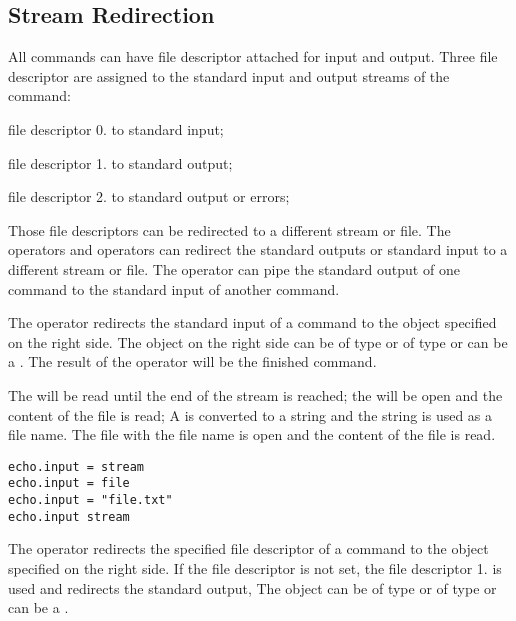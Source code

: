 \subsection{Stream Redirection}

All commands can have file descriptor attached for input and output.
Three file descriptor are assigned to the standard input and output streams
of the command:
\begin{compactitem}
\item file descriptor 0. to standard input;
\item file descriptor 1. to standard output;
\item file descriptor 2. to standard output or errors;
\end{compactitem}

Those file descriptors can be redirected to a different stream
or file. The operators  and
operators \code{<<, >>} can redirect the standard outputs
or standard input to a different stream or file. The operator \code{|} 
can pipe the standard output of one command to the standard input of another command.

%

The  operator redirects the standard input of
a command to the object specified on the right side. The object on the right 
side can be of type \TypeStream or of type \TypeFile or can be a \TypeGenericObject. 
The result of the operator will be the finished command.

The \TypeStream will be read until the end of the stream
is reached; the \TypeFile will be open and the content of the file is read;
A \TypeGenericObject is converted to a string and the string is used as a file name. 
The file with the file name is open and the content of the file is read.

\begin{lstlisting}[style=Groovybash, label={lst:example_input1_op}]
echo.input = stream
echo.input = file
echo.input = "file.txt"
echo.input stream
\end{lstlisting}

%

The  operator redirects the specified file descriptor of
a command to the object specified on the right side. If the file descriptor
is not set, the file descriptor 1. is used and redirects the standard output, 
The object can be of type \TypeStream or of type \TypeFile or can be a \TypeGenericObject. 

